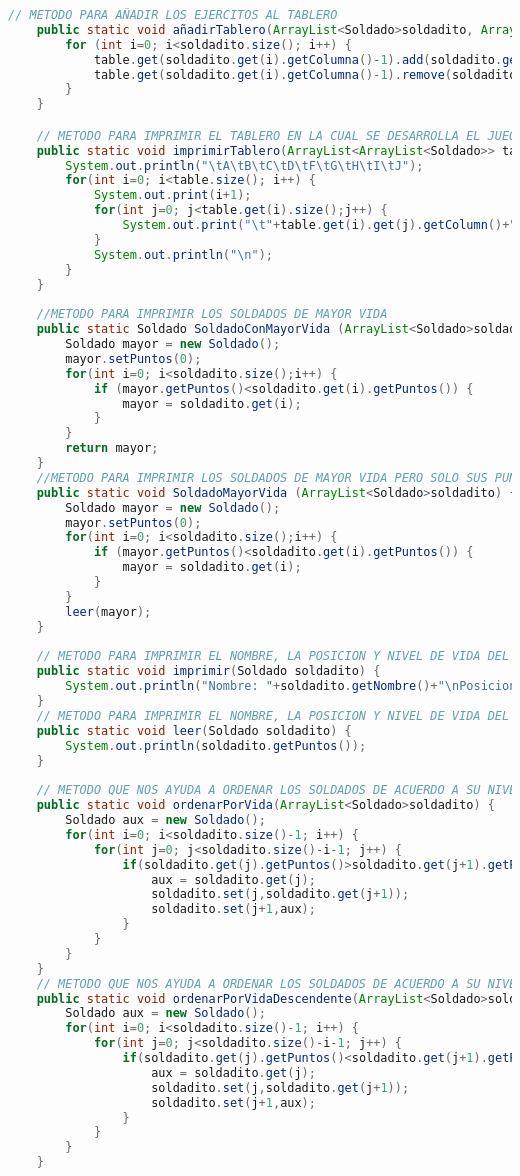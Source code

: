 \documentclass{article}
\begin{document}
\begin{itemize}
\begin{itemize}
\begin{lstlisting}[language=java]
	// METODO PARA AÑADIR LOS EJERCITOS AL TABLERO
	public static void añadirTablero(ArrayList<Soldado>soldadito, ArrayList<ArrayList<Soldado>>table) {
		for (int i=0; i<soldadito.size(); i++) {
			table.get(soldadito.get(i).getColumna()-1).add(soldadito.get(i).getFila()-1,soldadito.get(i));
			table.get(soldadito.get(i).getColumna()-1).remove(soldadito.get(i).getFila());
		}
	}

	// METODO PARA IMPRIMIR EL TABLERO EN LA CUAL SE DESARROLLA EL JUEGO
	public static void imprimirTablero(ArrayList<ArrayList<Soldado>> table) {
		System.out.println("\tA\tB\tC\tD\tF\tG\tH\tI\tJ");
		for(int i=0; i<table.size(); i++) {
			System.out.print(i+1);
			for(int j=0; j<table.get(i).size();j++) {
				System.out.print("\t"+table.get(i).get(j).getColumn()+"|");
			}
			System.out.println("\n");
		}
	}
	
	//METODO PARA IMPRIMIR LOS SOLDADOS DE MAYOR VIDA
	public static Soldado SoldadoConMayorVida (ArrayList<Soldado>soldadito) {
		Soldado mayor = new Soldado();
		mayor.setPuntos(0);
		for(int i=0; i<soldadito.size();i++) {
			if (mayor.getPuntos()<soldadito.get(i).getPuntos()) {
				mayor = soldadito.get(i);
			}
		}
		return mayor;
	}
	//METODO PARA IMPRIMIR LOS SOLDADOS DE MAYOR VIDA PERO SOLO SUS PUNTOS DE VIDA
	public static void SoldadoMayorVida (ArrayList<Soldado>soldadito) {
		Soldado mayor = new Soldado();
		mayor.setPuntos(0);
		for(int i=0; i<soldadito.size();i++) {
			if (mayor.getPuntos()<soldadito.get(i).getPuntos()) {
				mayor = soldadito.get(i);
			}
		}
		leer(mayor);
	}
	
	// METODO PARA IMPRIMIR EL NOMBRE, LA POSICION Y NIVEL DE VIDA DEL SOLDADO
	public static void imprimir(Soldado soldadito) {
		System.out.println("Nombre: "+soldadito.getNombre()+"\nPosicion: "+soldadito.getColumna()+"X"+soldadito.getFila()+"\tVida: "+soldadito.getPuntos());
	}
	// METODO PARA IMPRIMIR EL NOMBRE, LA POSICION Y NIVEL DE VIDA DEL SOLDADO
	public static void leer(Soldado soldadito) {
		System.out.println(soldadito.getPuntos());
	}
	
	// METODO QUE NOS AYUDA A ORDENAR LOS SOLDADOS DE ACUERDO A SU NIVEL DE VIDA
	public static void ordenarPorVida(ArrayList<Soldado>soldadito) {
		Soldado aux = new Soldado();
		for(int i=0; i<soldadito.size()-1; i++) {
			for(int j=0; j<soldadito.size()-i-1; j++) {
				if(soldadito.get(j).getPuntos()>soldadito.get(j+1).getPuntos()) {
					aux = soldadito.get(j);
					soldadito.set(j,soldadito.get(j+1));
					soldadito.set(j+1,aux);
				}
			}
		}
	}
	// METODO QUE NOS AYUDA A ORDENAR LOS SOLDADOS DE ACUERDO A SU NIVEL DE VIDA (DE MAYOR A MENOR)
	public static void ordenarPorVidaDescendente(ArrayList<Soldado>soldadito) {
		Soldado aux = new Soldado();
		for(int i=0; i<soldadito.size()-1; i++) {
			for(int j=0; j<soldadito.size()-i-1; j++) {
				if(soldadito.get(j).getPuntos()<soldadito.get(j+1).getPuntos()) {
					aux = soldadito.get(j);
					soldadito.set(j,soldadito.get(j+1));
					soldadito.set(j+1,aux);
				}
			}
		}
	}
	

\end{lstlisting}
\end{itemize}
\end{itemize}
\end{document}

